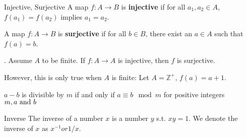 
\begin{mysubsection}{}
    \begin{definition}[def:]{Injective, Surjective}
        A map $f:A\rightarrow B$ is \textbf{injective} if for all $a_1,a_2\in A$, $f(a_1)=f(a_2)$ implies $a_1=a_2$.

        A map $f:A\rightarrow B$ is \textbf{surjective} if for all $b\in B$, there exist an $a\in A$ such that $f(a)=b$.
    \end{definition}
    . Assume $A$ to be finite. If $f:A\rightarrow A$ is injective, then $f$ is surjective.

    However, this is only true when $A$ is finite: Let $A=\mathbb{Z}^+$, $f(a)=a+1$.\\

    \begin{definition}[def:]{}
        $a-b$ is divisible by $m$ if and only if $a\equiv b \mod m$ \qquad for positive integers $m, a \textnormal{ and }b$
    \end{definition}

    \begin{definition}[def:]{Inverse}
        The inverse of a number $x$ is a number $y$ s.t. $xy=1$. We denote the inverse of $x$ as $x^{-1} or 1/x$.
    \end{definition}
\end{mysubsection}

\begin{example}[exp:]{}
\end{example}

\begin{shortque}[]{}

\end{shortque}

